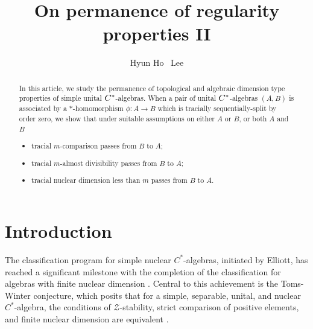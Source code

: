 \documentclass[12pt]{amsart}
\theoremstyle{plain}
\theoremstyle{definition}
\numberwithin{equation}{section}
\begin{document}
\title [ II ]
       {On permanence of regularity properties II}

\begin{abstract}
In this article, we study the permanence of topological and algebraic dimension type properties of simple unital $C\sp*$-algebras.  When a pair of unital $C\sp*$-algebras $(A, B)$ is associated by a $*$-homomorphism $\phi: A\to B$ which is  tracially sequentially-split by order zero, we show that under suitable assumptions on either $A$ or $B$, or  both $A$ and $B$
\begin{itemize}
\item tracial $m$-comparison passes from $B$ to $A$;
\item tracial $m$-almost divisibility passes from $B$ to $A$;
\item tracial nuclear dimension less than $m$ passes from $B$ to $A$.
\end{itemize}   
\end{abstract}

\author { Hyun Ho \, Lee}

\address {Department of Mathematics\\
        University of Ulsan\\
         Ulsan, 44610 South Korea 
          }




\date{}
\maketitle
\section{Introduction} 
\medskip
\noindent 
The classification program for simple nuclear $C^*$-algebras, initiated by Elliott, has reached a significant milestone with the completion of the classification for algebras with finite nuclear dimension \cite{CETWW, EGLN}. Central to this achievement is the Toms-Winter conjecture, which posits that for a simple, separable, unital, and nuclear $C^*$-algebra, the conditions of $\mathcal{Z}$-stability, strict comparison of positive elements, and finite nuclear dimension are equivalent \cite{Ro, W}.\\ 
\end{document}

